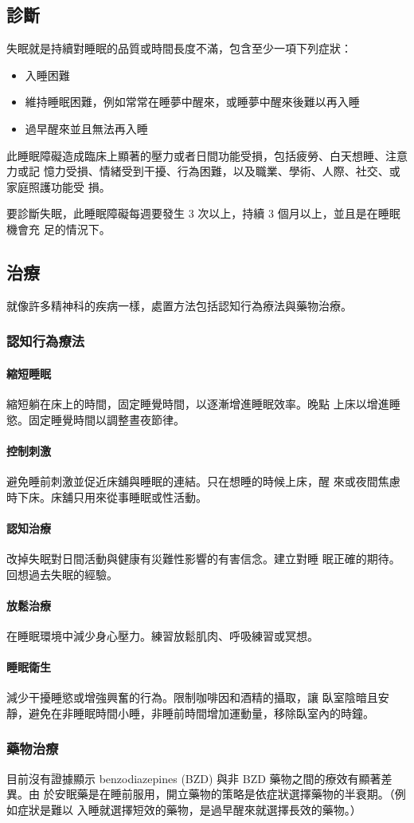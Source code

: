 \documentclass[a4paper, 12pt]{article}
\begin{document}
\subsection{診斷}
失眠就是持續對睡眠的品質或時間長度不滿，包含至少一項下列症狀：
\begin{itemize}
    \item 入睡困難
    \item 維持睡眠困難，例如常常在睡夢中醒來，或睡夢中醒來後難以再入睡
    \item 過早醒來並且無法再入睡
\end{itemize}

此睡眠障礙造成臨床上顯著的壓力或者日間功能受損，包括疲勞、白天想睡、注意力或記
憶力受損、情緒受到干擾、行為困難，以及職業、學術、人際、社交、或家庭照護功能受
損。

要診斷失眠，此睡眠障礙每週要發生 3 次以上，持續 3 個月以上，並且是在睡眠機會充
足的情況下。

\subsection{治療}
就像許多精神科的疾病一樣，處置方法包括認知行為療法與藥物治療。

\subsubsection{認知行為療法}
\paragraph{縮短睡眠} 縮短躺在床上的時間，固定睡覺時間，以逐漸增進睡眠效率。晚點
上床以增進睡慾。固定睡覺時間以調整晝夜節律。

\paragraph{控制刺激} 避免睡前刺激並促近床舖與睡眠的連結。只在想睡的時候上床，醒
來或夜間焦慮時下床。床舖只用來從事睡眠或性活動。

\paragraph{認知治療} 改掉失眠對日間活動與健康有災難性影響的有害信念。建立對睡
眠正確的期待。回想過去失眠的經驗。

\paragraph{放鬆治療} 在睡眠環境中減少身心壓力。練習放鬆肌肉、呼吸練習或冥想。

\paragraph{睡眠衛生} 減少干擾睡慾或增強興奮的行為。限制咖啡因和酒精的攝取，讓
臥室陰暗且安靜，避免在非睡眠時間小睡，非睡前時間增加運動量，移除臥室內的時鐘。

\subsubsection{藥物治療}
目前沒有證據顯示 benzodiazepines (BZD) 與非 BZD 藥物之間的療效有顯著差異。由
於安眠藥是在睡前服用，開立藥物的策略是依症狀選擇藥物的半衰期。（例如症狀是難以
入睡就選擇短效的藥物，是過早醒來就選擇長效的藥物。）

\nocite{*}


\end{document}
